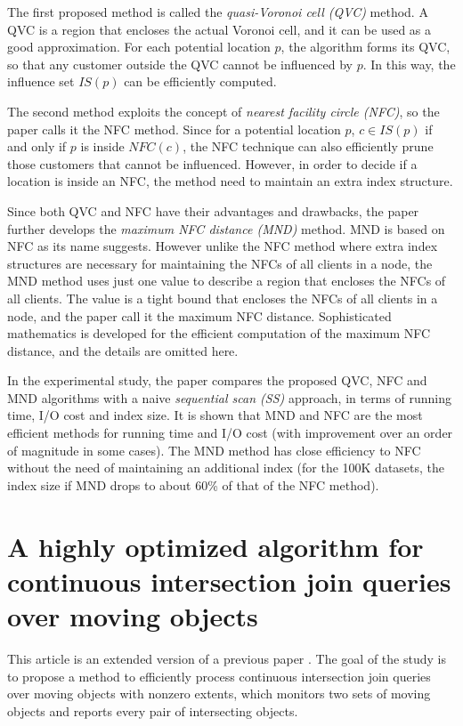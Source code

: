 \documentclass[paper=a4, fontsize=18pt]{article} %
\numberwithin{equation}{section} %
\numberwithin{figure}{section} %
\numberwithin{table}{section} %
\begin{document}
The first proposed method is called the \emph{quasi-Voronoi cell (QVC)} method. A QVC is a region that encloses the actual Voronoi cell, and it can be used as a good approximation. For each potential location $p$, the algorithm forms its QVC, so that any customer outside the QVC cannot be influenced by $p$. In this way, the influence set $IS(p)$ can be efficiently computed.

The second method exploits the concept of \emph{nearest facility circle (NFC)}, so the paper calls it the NFC method. Since for a potential location $p$, $c \in IS(p)$ if and only if $p$ is inside $NFC(c)$, the NFC technique can also efficiently prune those customers that cannot be influenced. However, in order to decide if a location is inside an NFC, the method need to maintain an extra index structure.

Since both QVC and NFC have their advantages and drawbacks, the paper further develops the \emph{maximum NFC distance (MND)} method. MND is based on NFC as its name suggests. However unlike the NFC method where extra index structures are necessary for maintaining the NFCs of all clients in a node, the MND method uses just one value to describe a region that encloses the NFCs of all clients. The value is a tight bound that encloses the NFCs of all clients in a node, and the paper call it the maximum NFC distance. Sophisticated mathematics is developed for the efficient computation of the maximum NFC distance, and the details are omitted here.

In the experimental study, the paper compares the proposed QVC, NFC and MND algorithms with a naive \emph{sequential scan (SS)} approach, in terms of running time, I/O cost and index size. It is shown that MND and NFC are the most efficient methods for running time and I/O cost (with improvement over an order of magnitude in some cases). The MND method has close efficiency to NFC without the need of maintaining an additional index (for the 100K datasets, the index size if MND drops to about 60\% of that of the NFC method).

\section{A highly optimized algorithm for continuous intersection join queries over moving objects \cite{ZQLWW12}}

This article is an extended version of a previous paper \cite{ZLRB08}. The goal of the study is to propose a method to efficiently process continuous intersection join queries over moving objects with nonzero extents, which monitors two sets of moving objects and reports every pair of intersecting objects.
\end{document}
